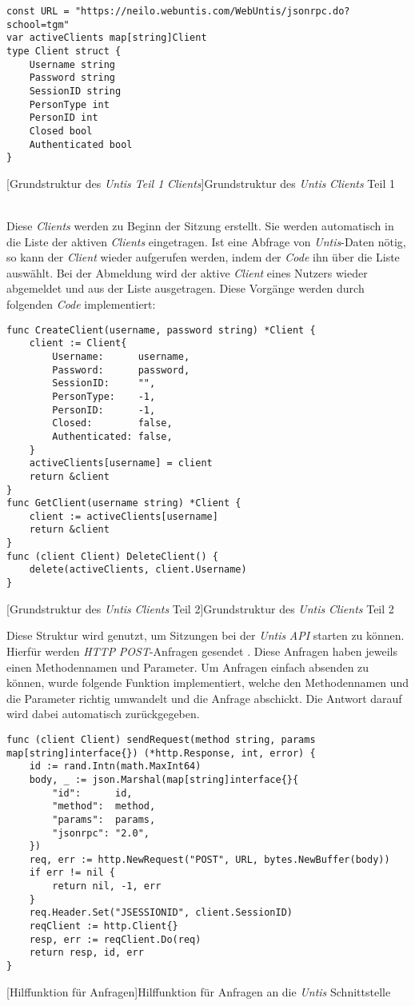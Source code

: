 \begin{verbatim}
const URL = "https://neilo.webuntis.com/WebUntis/jsonrpc.do?school=tgm"
var activeClients map[string]Client
type Client struct {
	Username string
	Password string
	SessionID string
	PersonType int
	PersonID int
	Closed bool
	Authenticated bool
}
\end{verbatim}
[Grundstruktur des \textit{Untis Teil 1} \textit{Clients}]{Grundstruktur des \textit{Untis} \textit{Clients} Teil 1}

~\\ Diese \textit{Clients} werden zu Beginn der Sitzung erstellt. Sie werden automatisch in die Liste der aktiven \textit{Clients} eingetragen. Ist eine Abfrage von \textit{Untis}-Daten nötig, so kann der \textit{Client} wieder aufgerufen werden, indem der \textit{Code} ihn über die Liste auswählt. Bei der Abmeldung wird der aktive \textit{Client} eines Nutzers wieder abgemeldet und aus der Liste ausgetragen. Diese Vorgänge werden durch folgenden \textit{Code} implementiert: 

\begin{verbatim}
func CreateClient(username, password string) *Client {
	client := Client{
		Username:      username,
		Password:      password,
		SessionID:     "",
		PersonType:    -1,
		PersonID:      -1,
		Closed:        false,
		Authenticated: false,
	}
	activeClients[username] = client
	return &client
}
func GetClient(username string) *Client {
	client := activeClients[username]
	return &client
}
func (client Client) DeleteClient() {
	delete(activeClients, client.Username)
}
\end{verbatim}
[Grundstruktur des \textit{Untis} \textit{Clients} Teil 2]{Grundstruktur des \textit{Untis} \textit{Clients} Teil 2}

Diese Struktur wird genutzt, um Sitzungen bei der \textit{Untis} \textit{API} starten zu können. Hierfür werden \textit{HTTP} \textit{POST}-Anfragen gesendet \cite{untis}. Diese Anfragen haben jeweils einen Methodennamen und Parameter. Um Anfragen einfach absenden zu können, wurde folgende Funktion implementiert, welche den Methodennamen und die Parameter richtig umwandelt und die Anfrage abschickt. Die Antwort darauf wird dabei automatisch zurückgegeben.
 
\begin{verbatim}
func (client Client) sendRequest(method string, params map[string]interface{}) (*http.Response, int, error) {
	id := rand.Intn(math.MaxInt64)
	body, _ := json.Marshal(map[string]interface{}{
		"id":      id,
		"method":  method,
		"params":  params,
		"jsonrpc": "2.0",
	})
	req, err := http.NewRequest("POST", URL, bytes.NewBuffer(body))
	if err != nil {
		return nil, -1, err
	}
	req.Header.Set("JSESSIONID", client.SessionID)
	reqClient := http.Client{}
	resp, err := reqClient.Do(req)
	return resp, id, err
}
\end{verbatim}
[Hilffunktion für Anfragen]{Hilffunktion für Anfragen an die \textit{Untis} Schnittstelle \cite{untis}}

